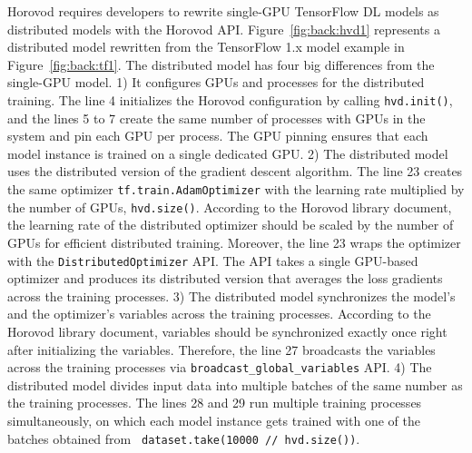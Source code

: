 Horovod requires developers to rewrite single-GPU TensorFlow DL models as
distributed models with the Horovod API. 
Figure~\ref{fig:back:hvd1} represents a distributed model rewritten from the
TensorFlow 1.x model example in Figure~\ref{fig:back:tf1}.
The distributed model has four big differences from the single-GPU model.
1) It configures GPUs and processes for the distributed training.
The line 4 initializes the Horovod configuration by calling {\tt hvd.init()},
and the lines 5 to 7 create the same number of processes with GPUs in the
system and pin each GPU per process. 
The GPU pinning ensures that each model instance is trained on a single
dedicated GPU.
2) The distributed model uses the distributed version of the gradient
descent algorithm. 
The line 23 creates the same optimizer {\tt tf.train.AdamOptimizer} with the
learning rate multiplied by the number of GPUs, {\tt hvd.size()}. 
According to the Horovod library document, the learning rate of the distributed
optimizer should be scaled by the number of GPUs for efficient distributed
training. 
Moreover, the line 23 wraps the optimizer with the {\tt DistributedOptimizer}
API. 
The API takes a single GPU-based optimizer and produces its distributed version
that averages the loss gradients across the training processes.
3) The distributed model synchronizes the model's and the optimizer's variables
across the training processes.
According to the Horovod library document, variables should be synchronized
exactly once right after initializing the variables.
Therefore, the line 27 broadcasts the variables across the training processes
via {\tt broadcast\_global\_variables} API.
4) The distributed model divides input data into multiple batches of the same
number as the training processes. 
The lines 28 and 29 run multiple training processes simultaneously, on which
each model instance gets trained with one of the batches obtained from {\tt
dataset.take(10000 // hvd.size())}. 



